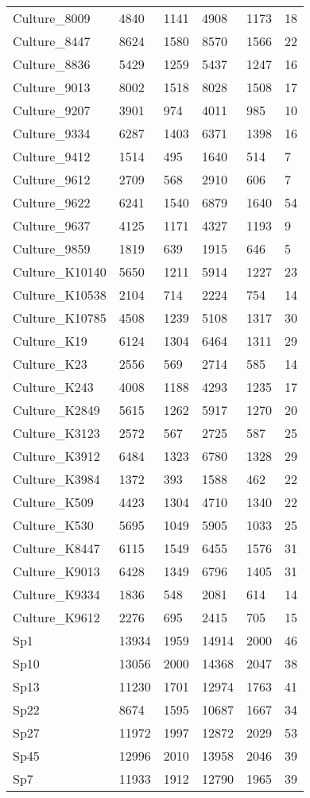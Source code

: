 \begin{longtable}{|P{3.5cm}|P{2cm}|P{2cm}|P{2cm}|P{2cm}|P{2cm}|}
Culture\_8009 & 4840 & 1141 & 4908 & 1173 &  18 \\ 
Culture\_8447 & 8624 & 1580 & 8570 & 1566 &  22 \\ 
Culture\_8836 & 5429 & 1259 & 5437 & 1247 &  16 \\ 
Culture\_9013 & 8002 & 1518 & 8028 & 1508 &  17 \\ 
Culture\_9207 & 3901 & 974 & 4011 & 985 &  10 \\ 
Culture\_9334 & 6287 & 1403 & 6371 & 1398 &  16 \\ 
Culture\_9412 & 1514 & 495 & 1640 & 514 &   7 \\ 
Culture\_9612 & 2709 & 568 & 2910 & 606 &   7 \\ 
Culture\_9622 & 6241 & 1540 & 6879 & 1640 &  54 \\ 
Culture\_9637 & 4125 & 1171 & 4327 & 1193 &   9 \\ 
Culture\_9859 & 1819 & 639 & 1915 & 646 &   5 \\ 
Culture\_K10140 & 5650 & 1211 & 5914 & 1227 &  23 \\ 
Culture\_K10538 & 2104 & 714 & 2224 & 754 &  14 \\ 
Culture\_K10785 & 4508 & 1239 & 5108 & 1317 &  30 \\ 
Culture\_K19 & 6124 & 1304 & 6464 & 1311 &  29 \\ 
Culture\_K23 & 2556 & 569 & 2714 & 585 &  14 \\ 
Culture\_K243 & 4008 & 1188 & 4293 & 1235 &  17 \\ 
Culture\_K2849 & 5615 & 1262 & 5917 & 1270 &  20 \\ 
Culture\_K3123 & 2572 & 567 & 2725 & 587 &  25 \\ 
Culture\_K3912 & 6484 & 1323 & 6780 & 1328 &  29 \\ 
Culture\_K3984 & 1372 & 393 & 1588 & 462 &  22 \\ 
Culture\_K509 & 4423 & 1304 & 4710 & 1340 &  22 \\ 
Culture\_K530 & 5695 & 1049 & 5905 & 1033 &  25 \\ 
Culture\_K8447 & 6115 & 1549 & 6455 & 1576 &  31 \\ 
Culture\_K9013 & 6428 & 1349 & 6796 & 1405 &  31 \\ 
Culture\_K9334 & 1836 & 548 & 2081 & 614 &  14 \\ 
Culture\_K9612 & 2276 & 695 & 2415 & 705 &  15 \\ 
Sp1 & 13934 & 1959 & 14914 & 2000 &  46 \\ 
Sp10 & 13056 & 2000 & 14368 & 2047 &  38 \\ 
Sp13 & 11230 & 1701 & 12974 & 1763 &  41 \\ 
Sp22 & 8674 & 1595 & 10687 & 1667 &  34 \\ 
Sp27 & 11972 & 1997 & 12872 & 2029 &  53 \\ 
Sp45 & 12996 & 2010 & 13958 & 2046 &  39 \\ 
Sp7 & 11933 & 1912 & 12790 & 1965 &  39 \\ 

\end{longtable}
		

